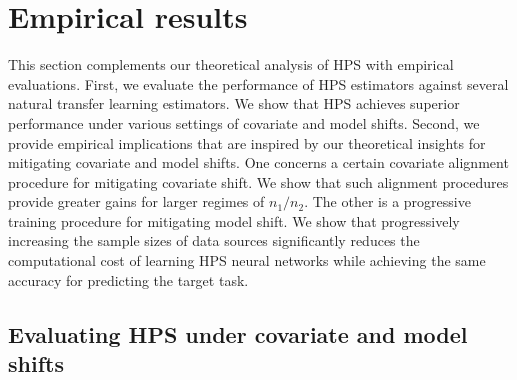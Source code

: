 \section{Empirical results}\label{sec_exp}

This section complements our theoretical analysis of HPS with empirical evaluations.
First, we evaluate the performance of HPS estimators against several natural transfer learning estimators.
We show that HPS achieves superior performance under various settings of covariate and model shifts.
Second, we provide empirical implications that are inspired by our theoretical insights for mitigating covariate and model shifts.
One concerns a certain covariate alignment procedure for mitigating covariate shift.
We show that such alignment procedures provide greater gains for larger regimes of $n_1 / n_2$.
The other is a progressive training procedure for mitigating model shift.
We show that progressively increasing the sample sizes of data sources significantly reduces the computational cost of learning HPS neural networks while achieving the same accuracy for predicting the target task.

\subsection{Evaluating HPS under covariate and model shifts}\label{sec_diff}

